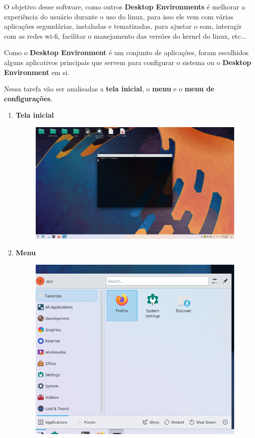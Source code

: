 \documentclass[10pt]{article}
\begin{document}
O objetivo desse software, como outros \textbf{Desktop Environments} é melhorar a experiência do usuário durante o uso do linux, para isso ele vem com várias aplicações segundárias, instaladas e tematizadas, para ajustar o som, interagir com as redes wi-fi, facilitar o manejamento das versões do kernel do linux, etc...

Como o \textbf{Desktop Environment} é um conjunto de aplicações, foram escolhidos alguns aplicativos principais que servem para configurar o sistema ou o \textbf{Desktop Environment} em si.

Nessa tarefa vão ser analisadas a \textbf{tela inicial}, o \textbf{menu} e o \textbf{menu de configurações}.

\begin{enumerate}
    \item \textbf{Tela inicial}
    \begin{figure}[h]
        \includegraphics[width=16cm]{desktop}
        \centering
    \end{figure}
    \newpage
    \item \textbf{Menu}
    \begin{figure}[h]
        \includegraphics[width=16cm]{menu_bar}

\end{figure}
\end{enumerate}
\end{document}
